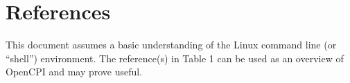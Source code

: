 \newpage

\tableofcontents

\def\assetsdoc{\noindent For more information on this application, see \code{ocpi.assets}'s more in-depth version of the \textit{FSK\_app} document.}

\newpage

\section{References}

	This document assumes a basic understanding of the Linux command line (or ``shell'') environment.  The reference(s) in Table 1 can be used as an overview of OpenCPI and may prove useful.

\def\myreferences{
\hline
FSK App\footnote{Provides details of the ``FSK App'' reference application} & OpenCPI & \path{FSK_app.pdf}\\
}


